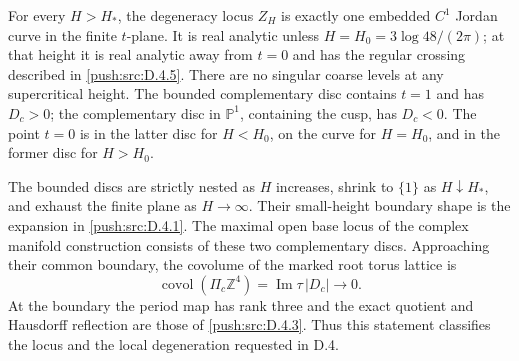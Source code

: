\begin{proposition}\label{push:src:D.4.8}

For every \(H>H_*\), the degeneracy locus \(Z_H\) is exactly one
embedded \(C^1\) Jordan curve in the finite \(t\)-plane. It is
real analytic unless \(H=H_0=3\log48/(2\pi)\); at that height it
is real analytic away from \(t=0\) and has the regular crossing
described in \ref{push:src:D.4.5}. There are no singular coarse levels at any
supercritical height. The bounded complementary disc contains
\(t=1\) and has \(D_c>0\); the complementary disc in
\(\mathbb P^1\), containing the cusp, has \(D_c<0\). The point
\(t=0\) is in the latter disc for \(H<H_0\), on the curve for
\(H=H_0\), and in the former disc for \(H>H_0\).

The bounded discs are strictly nested as \(H\) increases, shrink
to \(\{1\}\) as \(H\downarrow H_*\), and exhaust the finite
plane as \(H\to\infty\). Their small-height boundary shape is
the expansion in \ref{push:src:D.4.1}. The maximal open base locus of the complex
manifold construction consists of these two complementary discs.
Approaching their common boundary, the covolume of the marked
root torus lattice is
\[
 \operatorname{covol}(\Pi_c\mathbb Z^4)
       =\operatorname{Im}\tau\,|D_c|\longrightarrow0.
\]
At the boundary the period map has rank three and the exact quotient
and Hausdorff reflection are those of \ref{push:src:D.4.3}. Thus this statement
classifies the locus and the local degeneration requested in D.4.
\end{proposition}

